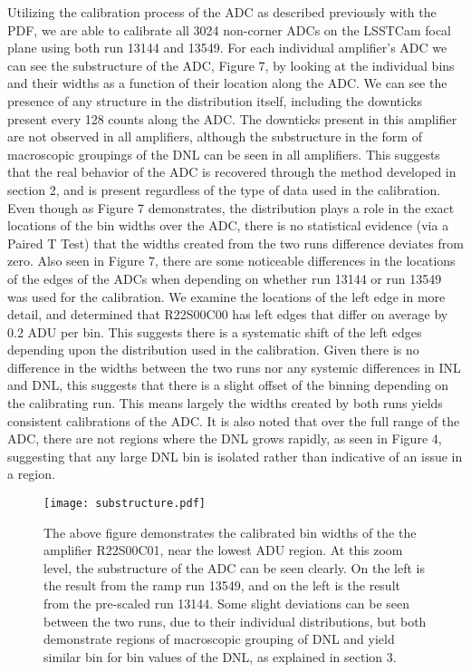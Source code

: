 \documentclass[11pt, letterpaper]{article}
\begin{document}
Utilizing the calibration process of the ADC as described previously with the PDF, we are able to calibrate all 3024 non-corner ADCs on the LSSTCam focal plane using both run 13144 and 13549. 
For each individual amplifier’s ADC we can see the substructure of the ADC, Figure 7, by looking at the individual bins and their widths as a function of their location along the ADC. 
We can see the presence of any structure in the distribution itself, including the downticks present every 128 counts along the ADC. 
The downticks present in this amplifier are not observed in all amplifiers, although the substructure in the form of macroscopic groupings of the DNL can be seen in all amplifiers.
This suggests that the real behavior of the ADC is recovered through the method developed in section 2, and is present regardless of the type of data used in the calibration.
Even though as Figure 7 demonstrates, the distribution plays a role in the exact locations of the bin widths over the ADC, there is no statistical evidence (via a Paired T Test) that the widths created from the two runs difference deviates from zero.  
Also seen in Figure 7, there are some noticeable differences in the locations of the edges of the ADCs when depending on whether run 13144 or run 13549 was used for the calibration.
We examine the locations of the left edge in more detail, and determined that R22S00C00 has left edges that differ on average by 0.2 ADU per bin. 
This suggests there is a systematic shift of the left edges depending upon the distribution used in the calibration.
Given there is no difference in the widths between the two runs nor any systemic differences in INL and DNL, this suggests that there is a slight offset of the binning depending on the calibrating run.
This means largely the widths created by both runs yields consistent calibrations of the ADC. 
It is also noted that over the full range of the ADC, there are not regions where the DNL grows rapidly, as seen in Figure 4, suggesting that any large DNL bin is isolated rather than indicative of an issue in a region. 
\begin{figure}
	\texttt{[image: substructure.pdf]}
	\caption{The above figure demonstrates the calibrated bin widths of the the amplifier R22S00C01, near the lowest ADU region. At this zoom level, the substructure of the ADC can be seen clearly. On the left is the result from the ramp run 13549, and on the left is the result from the pre-scaled run 13144.  Some slight deviations can be seen between the two runs, due to their individual distributions, but both demonstrate regions of macroscopic grouping of DNL and yield similar bin for bin values of the DNL, as explained in section 3.}
\end{figure}
\indent 
\end{document}

